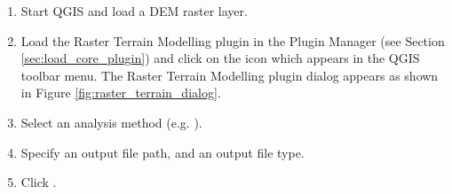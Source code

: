 \label{raster_terrain_usage}

\begin{enumerate}
  \item Start QGIS and load a DEM raster layer. 
  \item Load the Raster Terrain Modelling plugin in the Plugin Manager (see Section 
  \ref{sec:load_core_plugin}) and click on the  icon which appears in the QGIS toolbar menu. The Raster Terrain Modelling plugin dialog
appears as shown in Figure \ref{fig:raster_terrain_dialog}.
  \item Select an analysis method (e.g. ).
  \item Specify an output file
path, and an output file type.
  \item Click .
\end{enumerate}

\FloatBarrier
